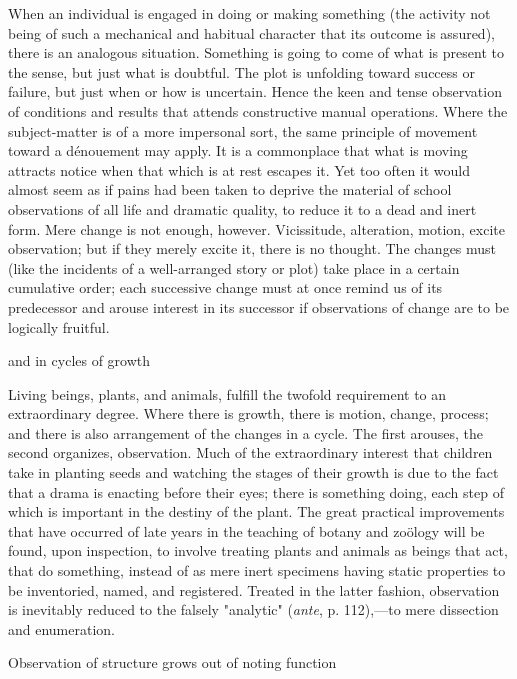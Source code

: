 \documentclass[letterpaper]{book}
\begin{document}
When an individual is engaged in doing or making something (the activity
not being of such a mechanical and habitual character that its outcome
is assured), there is an analogous situation. Something is going to come
of what is present to the sense, but just what is doubtful. The plot is
unfolding toward success or failure, but just when or how is uncertain.
Hence the keen and tense observation of conditions and results that
attends constructive manual operations. Where the subject-matter is of a
more impersonal sort, the same principle of movement toward a dénouement
may apply. It is a commonplace that what is moving attracts notice when
that which is at rest escapes it. Yet too often it would almost seem as
if pains had been taken to deprive the material of school observations
of all life and dramatic quality, to reduce it to a dead and inert form.
Mere change is not enough, however. Vicissitude, alteration, motion,
excite observation; but if they merely excite it, there is no thought.
The changes must (like the incidents of a well-arranged story or plot)
take place in a certain cumulative order; each successive change must at
once remind us of its predecessor and arouse interest in its successor
if observations of change are to be logically fruitful.

and in cycles of growth

Living beings, plants, and animals, fulfill the twofold requirement to
an extraordinary degree. Where
there
is growth, there is motion, change, process; and there is also
arrangement of the changes in a cycle. The first arouses, the second
organizes, observation. Much of the extraordinary interest that children
take in planting seeds and watching the stages of their growth is due to
the fact that a drama is enacting before their eyes; there is something
doing, each step of which is important in the destiny of the plant. The
great practical improvements that have occurred of late years in the
teaching of botany and zoölogy will be found, upon inspection, to
involve treating plants and animals as beings that act, that do
something, instead of as mere inert specimens having static properties
to be inventoried, named, and registered. Treated in the latter fashion,
observation is inevitably reduced to the falsely "analytic"
(\emph{ante}, p. 112),---to mere dissection and enumeration.

Observation of structure grows out of noting function
\end{document}
